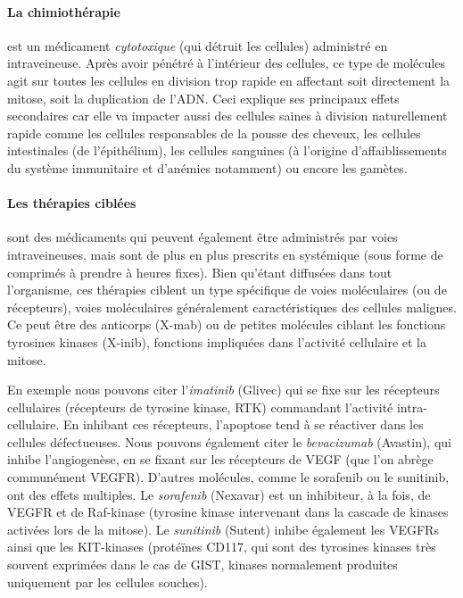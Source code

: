 \documentclass[main.tex]{subfiles}
\begin{document}
\paragraph{La chimiothérapie} est un médicament \emph{cytotoxique} (\ie qui détruit les cellules) administré en intraveineuse. 
Après avoir pénétré à l'intérieur des cellules, ce type de molécules agit 
sur toutes les cellules en division trop rapide en affectant soit directement la mitose, soit la duplication de l'ADN. 
Ceci explique ses principaux effets secondaires car elle va impacter aussi des cellules saines à division naturellement rapide comme les cellules responsables de la pousse des cheveux, les cellules intestinales (de l'épithélium), les cellules sanguines (à l'origine d'affaiblissements du système immunitaire et d'anémies notamment) ou encore les gamètes.

\paragraph{Les thérapies ciblées} sont des médicaments qui peuvent également être administrés par voies intraveineuses, mais sont de plus en plus prescrits en %
systémique 
(\ie sous forme de comprimés à prendre à heures fixes). Bien qu'étant diffusées dans tout l'organisme, ces thérapies ciblent un type spécifique de voies moléculaires (ou de récepteurs), voies moléculaires généralement caractéristiques des cellules malignes. Ce peut être des anticorps (X-mab) ou de petites molécules ciblant les fonctions tyrosines kinases (X-inib), fonctions impliquées dans l'activité cellulaire et la mitose. 

En exemple nous pouvons citer l'\emph{imatinib} (Glivec) qui se fixe sur les récepteurs cellulaires (récepteurs de tyrosine kinase, RTK) commandant l'activité intra-cellulaire. En inhibant ces récepteurs, l'apoptose tend à se réactiver dans les cellules défectueuses. 
Nous pouvons également citer le \emph{bevacizumab} (Avastin), qui inhibe l'angiogenèse, en se fixant sur les récepteurs de VEGF (que l'on abrège communément VEGFR). D'autres molécules, comme  le sorafenib ou le sunitinib, ont des effets multiples. 
Le \emph{sorafenib} (Nexavar) est un inhibiteur, à la fois, de VEGFR et de Raf-kinase (tyrosine kinase intervenant dans la cascade de kinases activées lors de la mitose). 
Le \emph{sunitinib} (Sutent) inhibe également les VEGFRs ainsi que les KIT-kinases (protéïnes CD117, qui sont des tyrosines kinases très souvent exprimées dans le cas de GIST, kinases normalement produites uniquement par les cellules souches).
\end{document}
